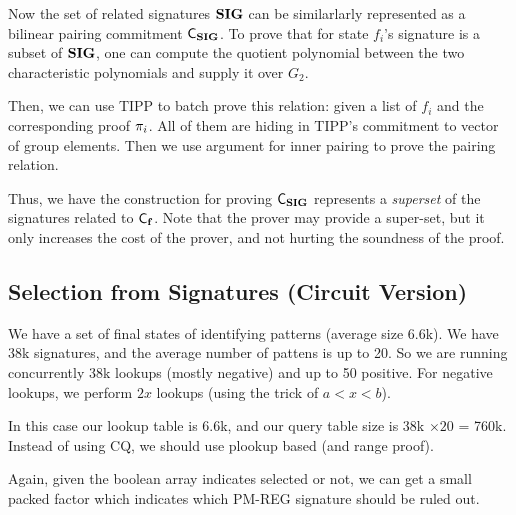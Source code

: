 Now the set of related signatures ${{\mathbf {SIG}}}$ can
be similarlarly represented as a bilinear pairing
commitment ${\mathsf{C}}_{{{\mathbf {SIG}}}}$.  To prove that
for state $f_i$'s signature is a subset
of ${{\mathbf {SIG}}}$, one can compute the quotient polynomial
between the two characteristic polynomials and supply it
over $G_2$.

Then, we can use TIPP to batch prove this relation:
given a list of $f_i$ and the corresponding proof $\pi_i$.
All of them are hiding in TIPP's commitment to vector
of group elements. Then we use argument for inner pairing
to prove the pairing relation.

Thus, we have the construction for proving
${\mathsf{C}}_{{{\mathbf {SIG}}}}$ represents a {\em superset}
of the signatures related to ${\mathsf{C}}_{{{\mathbf {f}}}}$.
Note that the prover may provide a super-set, but
it only increases the cost of the prover, and not hurting
the soundness of the proof.

\subsection{Selection from Signatures (Circuit Version)}
We have a set of final states of identifying patterns (average
size 6.6k). We have 38k signatures, and the average number of
pattens is up to 20. So we are running concurrently
38k lookups (mostly negative) and up to 50 positive.
For negative lookups, we perform $2x$ lookups (using
the trick of $a<x<b$).

In this case our lookup table is 6.6k, and our query table size
is 38k $\times 20$ = 760k. Instead of using CQ, we should
use plookup based (and range proof).

Again, given the boolean array indicates selected or not,
we can get a small packed factor which indicates which
PM-REG signature should be ruled out.


